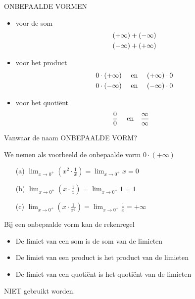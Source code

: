 \documentclass[handout]{beamer}
\begin{document}
\begin{frame}
\begin{alertblock}{ONBEPAALDE VORMEN}
\begin{itemize}
	\item voor de som
	\[\aligned
	& (+ \infty) + (-\infty) \\
& (- \infty) + (+ \infty) \\
\endaligned
\]
\item voor het product
\[\aligned
& 0 \cdot (+ \infty) \quad \text { en } \quad (+ \infty) \cdot 0 \\
& 0 \cdot (- \infty) \quad \text { en } \quad (- \infty) \cdot 0
\\
\endaligned
\]
\item voor het quoti\"ent
\[\aligned
& \frac{0}{0} \quad \text { en} \quad \frac{\infty}{\infty}
\endaligned
\]

\end{itemize}
\end{alertblock}
\end{frame}

\begin{frame}{Vanwaar de naam ONBEPAALDE VORM?}
\begin{exampleblock}{We nemen als voorbeeld de onbepaalde vorm $0 \cdot (+
\infty)$ }
\begin{itemize}
\item[(a)]
$\displaystyle{\lim_{x \to 0^+}} (x^2 \cdot \frac{1}{x}) =
\displaystyle{\lim_{x \to 0^+}} x = 0$ 
\item[(b)]
$\displaystyle{\lim_{x \to 0^+}} (x \cdot \frac{1}{x})=
\displaystyle{\lim_{x \to 0^+}} 1 = 1$ 
\item[(c)]
$\displaystyle{\lim_{x \to 0^+}} (x \cdot \frac{1}{x^2}) =
\displaystyle{\lim_{x \to 0^+}} \frac{1}{x} = + \infty$



\end{itemize}
\end{exampleblock}
\end{frame}

\begin{frame}
Bij een onbepaalde vorm kan de rekenregel
\begin{itemize}
	\item De limiet
van een som is de som van de limieten
\item De limiet van een product is
het product van de limieten
\item De limiet van een quoti\"ent is het
quoti\"ent van de limieten
\end{itemize}
NIET gebruikt worden.

\end{frame}
\end{document}
